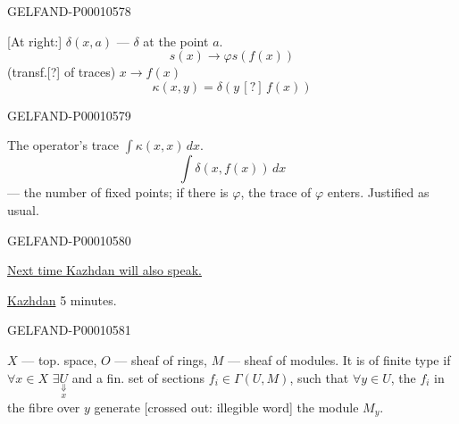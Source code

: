 \begin{GelfandAdjacentEvidence}{GELFAND-P000105}{78}

[At right:] $\delta(x,a)$ — $\delta$ at the point $a$.
\begin{equation*}s(x)\longrightarrow\varphi s(f(x))\end{equation*}
(transf.[?] of traces) $x\longrightarrow f(x)$
\begin{equation*}\kappa(x,y)=\delta(y\,{[?]}\,f(x))\end{equation*}
\end{GelfandAdjacentEvidence}
\begin{GelfandAdjacentEvidence}{GELFAND-P000105}{79}

The operator's trace $\int\kappa(x,x)\,dx$.
\begin{equation*}\int\delta(x,f(x))\,dx\end{equation*}
— the number of fixed points; if there is $\varphi$, the trace of $\varphi$ enters. Justified as usual.
\end{GelfandAdjacentEvidence}
\begin{GelfandAdjacentEvidence}{GELFAND-P000105}{80}


\underline{Next time Kazhdan will also speak.}
\par\underline{Kazhdan} 5 minutes.
\end{GelfandAdjacentEvidence}
\begin{GelfandAdjacentEvidence}{GELFAND-P000105}{81}

$X$ — top. space, $O$ — sheaf of rings, $M$ — sheaf of modules.
It is of finite type if $\forall x\in X$ $\exists\underset{x}{\underset{\Downarrow}{U}}$ and a fin. set of sections
$f_i\in\Gamma(U,M)$, such that $\forall y\in U$, the $f_i$ in the fibre over $y$
generate [crossed out: illegible word] the module $M_y$.
\end{GelfandAdjacentEvidence}
